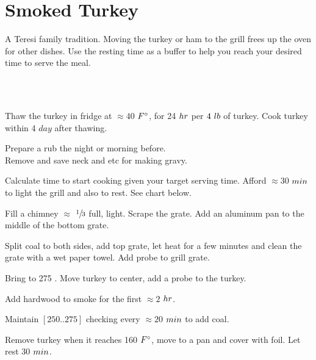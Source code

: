 \section{Smoked Turkey}

\begin{recipestats}[
        servings=1\onefourth~\pound/person,
        preptime=45~\minute,
        bakingtime=$\approx5~\hour$,
        inactivetime=30~\minute,
        source=Teresi~Family,
    ]
\end{recipestats}

\begin{recipeabstract}
    A Teresi family tradition.
    Moving the turkey or ham to the grill frees up the oven for other dishes.
    Use the resting time as a buffer to help you reach your desired time to
    serve the meal.
\end{recipeabstract}

\begin{ingredientcolumns}[1]
    \begin{ingredientblock}
        \\
        \\
    \end{ingredientblock}
\end{ingredientcolumns}

\begin{preparation}
\item Thaw the turkey in fridge at $\approx40$ $\Fahrenheit$, for 24 $\hour$
    per $4~\pound$ of turkey.
    Cook turkey within 4 $day$ after thawing.
\item Prepare a rub the night or morning before.\\
    Remove and save neck and etc for making gravy.
\item Calculate time to start cooking given your target serving time.
    Afford $\approx30$ $\minute$ to light the grill and also to rest.
    See chart below.
\item Fill a chimney $\approx$ $\onethird$ full, light.
    Scrape the grate.
    Add an aluminum pan to the middle of the bottom grate.
\item Split coal to both sides, add top grate, let heat for a few minutes and
    clean the grate with a wet paper towel.
    Add probe to grill grate.
\item Bring to 275 \Fahrenheit.
    Move turkey to center, add a probe to the turkey.
\item Add hardwood to smoke for the first $\approx2$ $\hour$.
\item Maintain $[250..275]$ checking every $\approx20$ $\minute$ to add coal.
\item Remove turkey when it reaches 160 $\Fahrenheit$, move to a pan and
    cover with foil. Let rest 30 $\minute$.
\end{preparation}

